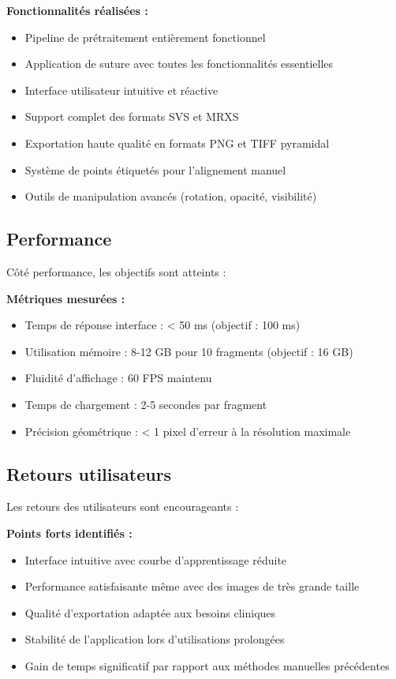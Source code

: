 \documentclass[11pt,a4paper]{report}
\begin{document}
\textbf{Fonctionnalités réalisées :}
\begin{itemize}
\item Pipeline de prétraitement entièrement fonctionnel
\item Application de suture avec toutes les fonctionnalités essentielles
\item Interface utilisateur intuitive et réactive
\item Support complet des formats SVS et MRXS
\item Exportation haute qualité en formats PNG et TIFF pyramidal
\item Système de points étiquetés pour l'alignement manuel
\item Outils de manipulation avancés (rotation, opacité, visibilité)
\end{itemize}

\subsection{Performance}

Côté performance, les objectifs sont atteints :

\textbf{Métriques mesurées :}
\begin{itemize}
\item Temps de réponse interface : < 50 ms (objectif : 100 ms)
\item Utilisation mémoire : 8-12 GB pour 10 fragments (objectif : 16 GB)
\item Fluidité d'affichage : 60 FPS maintenu
\item Temps de chargement : 2-5 secondes par fragment
\item Précision géométrique : < 1 pixel d'erreur à la résolution maximale
\end{itemize}

\subsection{Retours utilisateurs}

Les retours des utilisateurs sont encourageants :

\textbf{Points forts identifiés :}
\begin{itemize}
\item Interface intuitive avec courbe d'apprentissage réduite
\item Performance satisfaisante même avec des images de très grande taille
\item Qualité d'exportation adaptée aux besoins cliniques
\item Stabilité de l'application lors d'utilisations prolongées
\item Gain de temps significatif par rapport aux méthodes manuelles précédentes
\end{itemize}
\end{document}

